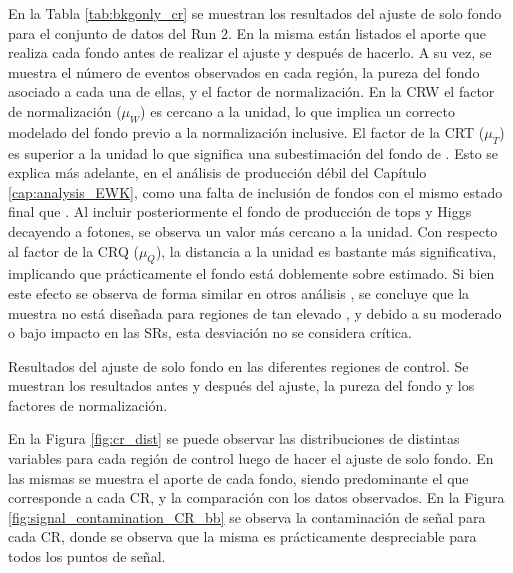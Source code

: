 En la Tabla \ref{tab:bkgonly_cr} se muestran los resultados del ajuste de solo fondo para el conjunto de datos del Run 2. En la misma están listados el aporte que realiza cada fondo antes de realizar el ajuste y después de hacerlo. A su vez, se muestra el número de eventos observados en cada región, la pureza del fondo asociado a cada una de ellas, y el factor de normalización. 
En la CRW el factor de normalización ($\mu_W$) es cercano a la unidad, lo que implica un correcto modelado del fondo previo a la normalización inclusive. El factor de la CRT ($\mu_T$) es superior a la unidad lo que significa una subestimación del fondo de \ttbarph. Esto se explica más adelante, en el análisis de producción débil del Capítulo \ref{cap:analysis_EWK}, como una falta de inclusión de fondos con el mismo estado final que \ttbarph. Al incluir posteriormente el fondo de producción de tops y Higgs decayendo a fotones, se observa un valor más cercano a la unidad. Con respecto al factor de la CRQ ($\mu_Q$), la distancia a la unidad es bastante más significativa, implicando que prácticamente el fondo está doblemente sobre estimado. Si bien este efecto se observa de forma similar en otros análisis \cite{Alonso:2689095}, se concluye que la muestra no está diseñada para regiones de tan elevado \met, y debido a su moderado o bajo impacto en las SRs, esta desviación no se considera crítica. 

\begin{table}[ht!]
  \centering
  \caption{Resultados del ajuste de solo fondo en las diferentes regiones de control. Se muestran los resultados antes y después del ajuste, la pureza del fondo y los factores de normalización.}
  
  \label{tab:bkgonly_cr}
\end{table}

En la Figura \ref{fig:cr_dist} se puede observar las distribuciones de distintas variables para cada región de control luego de hacer el ajuste de solo fondo. En las mismas se muestra el aporte de cada fondo, siendo predominante el que corresponde a cada CR, y la comparación con los datos observados. En la Figura \ref{fig:signal_contamination_CR_bb} se observa la contaminación de señal para cada CR, donde se observa que la misma es prácticamente despreciable para todos los puntos de señal.



